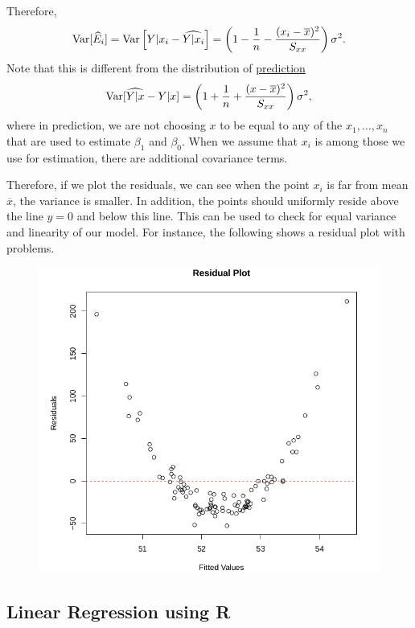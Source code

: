 Therefore,
\begin{align*}
\mathrm{Var}[\widehat{E}_i] = \mathrm{Var}\left[Y|x_i - \widehat{Y|x_i} \right] = \left(1 - \frac{1}{n} - \frac{(x_i-\overline{x})^2}{S_{xx}} \right)\sigma^2.
\end{align*}
Note that this is different from the distribution of \underline{prediction}
\begin{align*}
\mathrm{Var}[\widehat{Y|x} - Y|x] = \left(1 + \frac{1}{n} + \frac{(x-\overline{x})^2}{S_{xx}} \right)\sigma^2,
\end{align*}
where in prediction, we are not choosing $x$ to be equal to any of the $x_1, \ldots, x_n$ that are used to estimate $\beta_1$ and $\beta_0$. When we assume that $x_i$ is among those we use for estimation, there are additional covariance terms.

Therefore, if we plot the residuals, we can see when the point $x_i$ is far from mean $\overline{x}$, the variance is smaller. In addition, the points should uniformly reside above the line $y = 0$ and below this line. This can be used to check for equal variance and linearity of our model. For instance, the following shows a residual plot with problems.

\begin{figure}[H]
	\centering
	\includegraphics[width=12cm]{./images/s7fig1.png}
\end{figure}


\subsection*{Linear Regression using R}


